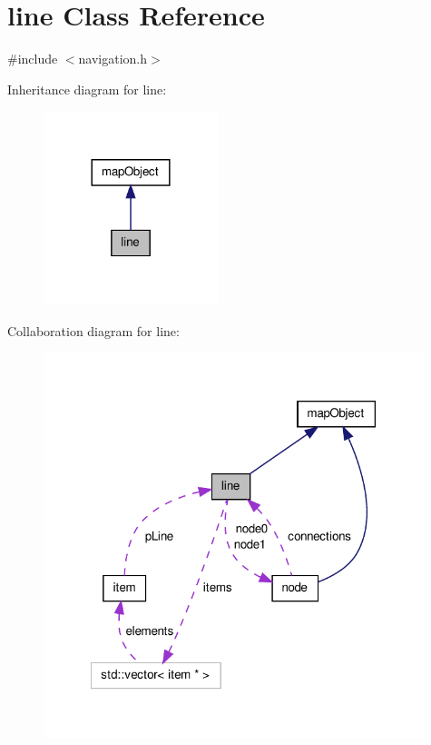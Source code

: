 \hypertarget{classline}{\section{line \-Class \-Reference}
\label{classline}
}


{\ttfamily \#include $<$navigation.\-h$>$}



\-Inheritance diagram for line\-:\nopagebreak
\begin{figure}[H]
\begin{center}
\leavevmode
\includegraphics[width=144pt]{classline__inherit__graph}
\end{center}
\end{figure}


\-Collaboration diagram for line\-:\nopagebreak
\begin{figure}[H]
\begin{center}
\leavevmode
\includegraphics[width=314pt]{classline__coll__graph}
\end{center}
\end{figure}
